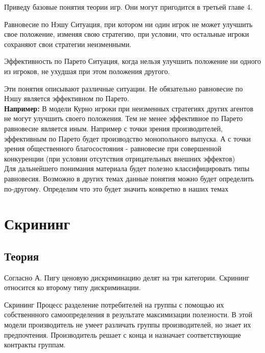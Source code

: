 \indent\setlength{\parindent}{1em}Приведу базовые понятия теории игр. Они могут пригодится в третьей главе 4.

\begin{mybox}{Равновесие по Нэшу}
    Ситуация, при котором ни один игрок не может улучшить свое положение, изменяя свою стратегию, при условии, что
    остальные игроки сохраняют свои стратегии неизменными.
\end{mybox}

\begin{mybox}{Эффективность по Парето}
    Ситуация, когда нельзя улучшить положение ни одного из игроков, не ухудшая при этом положения другого.
\end{mybox}

Эти понятия описывают различные ситуации. Не обязательно равновесие по Нэшу является эффективном по Парето.
\smallskip\\\indent\setlength{\parindent}{1em} \textbf{Например:} В модели Курно игроки при неизменных стратегиях
других агентов не могут улучшить своего положения. Тем не менее эффективное по Парето равновесие является иным. Например
с точки зрения производителей, эффективным по Парето будет производство монопольного выпуска. А с точки зрения
общественного благосостояния - равновесие при совершенной конкуренции (при условии отсутствия отрицательных внешних
эффектов)\smallskip\\\indent\setlength{\parindent}{1em} Для дальнейшего понимания материала будет полезно
классифицировать типы равновесия. Возможно в других темах данные понятия можно будет определить по-другому. Определим
что это будет значить конкретно в наших темах

\newpage


\section{Скрининг}

\subsection{Теория}

\indent\setlength{\parindent}{1em} Согласно А. Пигу ценовую дискриминацию делят на три категории. Скрининг относится
ко второму типу дискриминации.

\begin{mybox}{Скрининг}
    Процесс разделение потребителей на группы с помощью их собственнного самоопределения в результате максимизации
    полезности. В этой модели производитель не умеет различать группы производителей, но знает их предпочтения.
    Производитель решает с конца и назначает соответствующие контракты группам.
\end{mybox}


